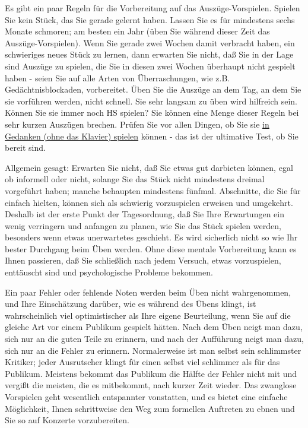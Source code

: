 Es gibt ein paar Regeln für die Vorbereitung auf das Auszüge-Vorspielen.
Spielen Sie kein Stück, das Sie gerade gelernt haben.
Lassen Sie es für mindestens sechs Monate schmoren; am besten ein Jahr (üben Sie während dieser Zeit das Auszüge-Vorspielen).
Wenn Sie gerade zwei Wochen damit verbracht haben, ein schwieriges neues Stück zu lernen, dann erwarten Sie nicht, daß Sie in der Lage sind Auszüge zu spielen, die Sie in diesen zwei Wochen überhaupt nicht gespielt haben - seien Sie auf alle Arten von Überraschungen, wie z.B. Gedächtnisblockaden, vorbereitet.
Üben Sie die Auszüge an dem Tag, an dem Sie sie vorführen werden, nicht schnell.
Sie sehr langsam zu üben wird hilfreich sein.
Können Sie sie immer noch HS spielen?
Sie können eine Menge dieser Regeln bei sehr kurzen Auszügen brechen.
Prüfen Sie vor allen Dingen, ob Sie sie \hyperlink{c1ii12mental}{in Gedanken (ohne das Klavier) spielen} können - das ist der ultimative Test, ob Sie bereit sind.

Allgemein gesagt: Erwarten Sie nicht, daß Sie etwas gut darbieten können, egal ob informell oder nicht, solange Sie das Stück nicht mindestens dreimal vorgeführt haben; manche behaupten mindestens fünfmal.
Abschnitte, die Sie für einfach hielten, können sich als schwierig vorzuspielen erweisen und umgekehrt.
Deshalb ist der erste Punkt der Tagesordnung, daß Sie Ihre Erwartungen ein wenig verringern und anfangen zu planen, wie Sie das Stück spielen werden, besonders wenn etwas unerwartetes geschieht.
Es wird sicherlich nicht so wie Ihr bester Durchgang beim Üben werden.
Ohne diese mentale Vorbereitung kann es Ihnen passieren, daß Sie schließlich nach jedem Versuch, etwas vorzuspielen, enttäuscht sind und psychologische Probleme bekommen.

Ein paar Fehler oder fehlende Noten werden beim Üben nicht wahrgenommen, und Ihre Einschätzung darüber, wie es während des Übens klingt, ist wahrscheinlich viel optimistischer als Ihre eigene Beurteilung, wenn Sie auf die gleiche Art vor einem Publikum gespielt hätten.
Nach dem Üben neigt man dazu, sich nur an die guten Teile zu erinnern, und nach der Aufführung neigt man dazu, sich nur an die Fehler zu erinnern.
Normalerweise ist man selbst sein schlimmster Kritiker; jeder Ausrutscher klingt für einen selbst viel schlimmer als für das Publikum.
Meistens bekommt das Publikum die Hälfte der Fehler nicht mit und vergißt die meisten, die es mitbekommt, nach kurzer Zeit wieder.
Das zwanglose Vorspielen geht wesentlich entspannter vonstatten, und es bietet eine einfache Möglichkeit, Ihnen schrittweise den Weg zum formellen Auftreten zu ebnen und Sie so auf Konzerte vorzubereiten.

